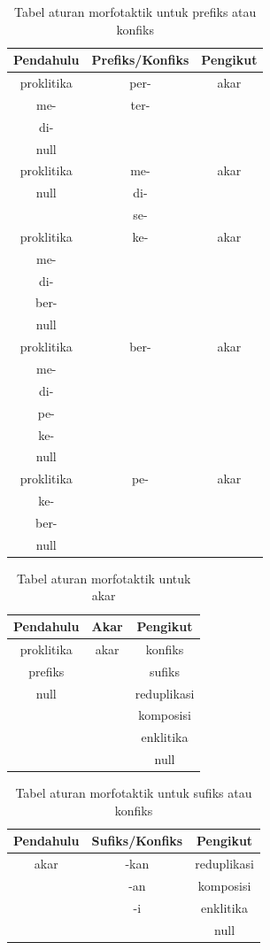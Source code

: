 \begin{table}[H]
\centering
\begin{tabular}{|c|c|c|}
\hline
\textbf{Pendahulu} & \textbf{Prefiks/Konfiks} & \textbf{Pengikut} \\
\hline
 proklitika&per-&akar\\
 me-&ter-& \\
 di-& & \\
 null& & \\
 \hline
 proklitika&me-&akar\\
 null&di-& \\
  &se-& \\
 \hline
 proklitika&ke-&akar\\
 me-& & \\
 di-& & \\
 ber-& & \\
 null& & \\
 \hline
 proklitika&ber-&akar\\
 me-& & \\
 di-& & \\
 pe-& & \\
 ke-& & \\
 null& & \\
 \hline
 proklitika&pe-&akar\\
 ke-& & \\
 ber-& & \\
 null& & \\
\hline
\end{tabular}
\caption{Tabel aturan morfotaktik untuk prefiks atau konfiks} 
\label{tabel-morfotaktik-prefiks}
\end{table}

\begin{table}[H]
\centering
\begin{tabular}{|c|c|c|}
\hline
\textbf{Pendahulu} & \textbf{Akar} & \textbf{Pengikut} \\
\hline
 proklitika&akar&konfiks\\
 prefiks& &sufiks\\
 null& &reduplikasi\\
 & &komposisi\\
 & &enklitika\\
 & &null\\
\hline
\end{tabular}
\caption{Tabel aturan morfotaktik untuk akar} 
\label{tabel-morfotaktik-akar}
\end{table}

\begin{table}[H]
\centering
\begin{tabular}{|c|c|c|}
\hline
\textbf{Pendahulu} & \textbf{Sufiks/Konfiks} & \textbf{Pengikut} \\
\hline
 akar&-kan&reduplikasi\\
 &-an&komposisi\\
 &-i&enklitika\\
 & &null\\
\hline
\end{tabular}
\caption{Tabel aturan morfotaktik untuk sufiks atau konfiks} 
\label{tabel-morfotaktik-sufiks}
\end{table}


